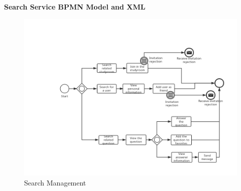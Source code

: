 \documentclass[runningheads]{llncs}
\begin{document}
\textbf{Search Service BPMN Model and XML}
\begin{figure}
  \centering
  \includegraphics[width=1\textwidth]{figure/pmz/SearchManagement.png}
  \caption{Search Management}
\end{figure}
\end{document}
